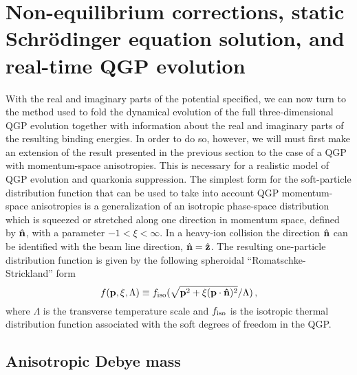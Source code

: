 
\section{Non-equilibrium corrections, static Schr\"odinger equation solution, and real-time QGP evolution}
\label{sec:dynamics}

With the real and imaginary parts of the potential specified, we can now turn to the method used to fold the dynamical evolution of the full three-dimensional QGP evolution together with information about the real and imaginary parts of the resulting binding energies.  In order to do so, however, we will must first make an extension of the result presented in the previous section to the case of a QGP with momentum-space anisotropies. This is necessary for a realistic model of QGP evolution and quarkonia suppression.  The simplest form for the soft-particle distribution function that can be used to take into account QGP momentum-space anisotropies is a generalization of an isotropic phase-space distribution which is squeezed or stretched along one direction in momentum space, defined by $\hat{\bf n}$, with a parameter $-1 < \xi < \infty$.  In a heavy-ion collision the direction $\hat{\bf n}$ can be identified with the beam line direction, $\hat{\bf n} = \hat{\bf z}$.  The resulting one-particle distribution function is given by the following spheroidal ``Romatschke-Strickland'' form \cite{Romatschke:2003ms,Romatschke:2004jh}
%
\begin{equation}
f({\bf p},\xi,\Lambda)\equiv f_{\rm iso}(\sqrt{{\bf p}^2+\xi({\bf p\cdot \hat{n}})^2}/\Lambda) \, ,
\label{distansatz}
\end{equation}
%
where $\Lambda$ is the transverse temperature scale and $f_{\rm iso}$ is the isotropic thermal distribution function associated with the soft degrees of freedom in the QGP.

\subsection{Anisotropic Debye mass}
\label{ssec:amd}

